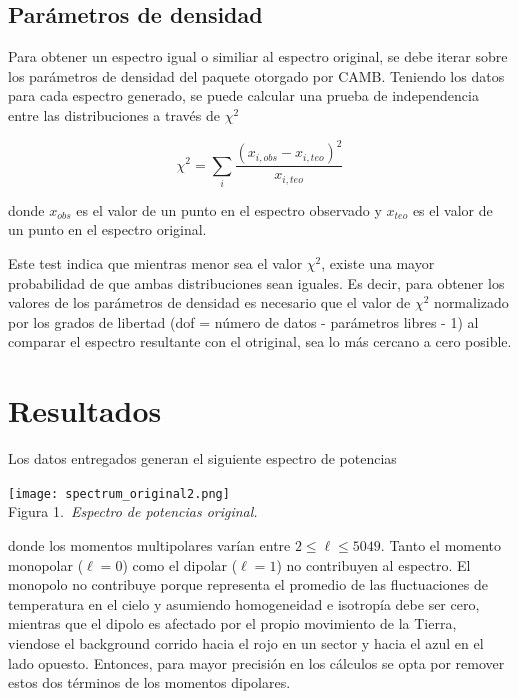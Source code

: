 \documentclass[twocolumn,letterpaper,spanish]{revtex4}
\numberwithin{equation}{section}
\begin{document}
\subsection{Par\'ametros de densidad}\label{parametros}

Para obtener un espectro igual o similiar al espectro original, se debe iterar sobre los par\'ametros de densidad del paquete otorgado por CAMB. Teniendo los datos para cada espectro generado, se puede calcular una prueba de independencia entre las distribuciones a trav\'es de $\chi^2$

\begin{equation}
\chi^2 = \displaystyle\sum_{i} \frac{(x_{i,obs} - x_{i,teo})^2}{x_{i,teo}}
\end{equation}

donde $x_{obs}$ es el valor de un punto en el espectro observado y $x_{teo}$ es el valor de un punto en el espectro original.

Este test indica que mientras menor sea el valor $\chi^2$, existe una mayor probabilidad de que ambas distribuciones sean iguales. Es decir, para obtener los valores de los par\'ametros de densidad es necesario que el valor de $\chi^2$ normalizado por los grados de libertad (dof = n\'umero de datos - par\'ametros libres - 1) al comparar el espectro resultante con el otriginal, sea lo m\'as cercano a cero posible.


\section{Resultados}\label{resultados}

Los datos entregados generan el siguiente espectro de potencias

\begin{center}
   \texttt{[image: spectrum\_original2.png]}\\
   Figura 1.\emph{\ Espectro de potencias original.}
\end{center}
donde los momentos multipolares var\'ian entre $2\leq\ell\leq 5049$. Tanto el momento monopolar ($\ell=0$) como el dipolar ($\ell=1$) no contribuyen al espectro. El monopolo no contribuye porque representa el promedio de las fluctuaciones de temperatura en el cielo y asumiendo homogeneidad e isotrop\'ia debe ser cero, mientras que el dipolo es afectado por el propio movimiento de la Tierra, viendose el background corrido hacia el rojo en un sector y hacia el azul en el lado opuesto. Entonces, para mayor precisi\'on en los c\'alculos se opta por remover estos dos t\'erminos de los momentos dipolares.
\end{document}
